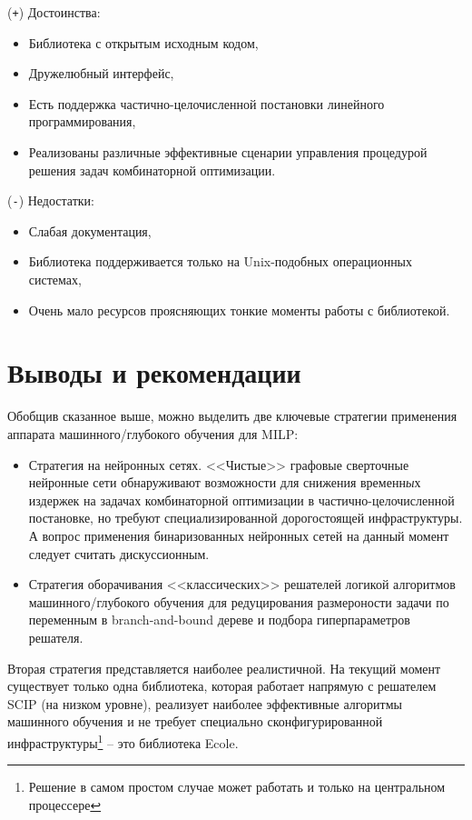 \documentclass[%
	11pt,
	a4paper,
	utf8,
		]{article}
\begin{document}
(\texttt{+}) Достоинства:
\begin{itemize}
	\item Библиотека с открытым исходным кодом,

	\item Дружелюбный интерфейс,

	\item Есть поддержка частично-целочисленной постановки линейного программирования,

	\item Реализованы различные эффективные сценарии управления процедурой решения задач комбинаторной оптимизации.
\end{itemize}

(\texttt{-}) Недостатки:
\begin{itemize}
	\item Слабая документация,

	\item Библиотека поддерживается только на Unix-подобных операционных системах,

	\item Очень мало ресурсов проясняющих тонкие моменты работы с библиотекой.
\end{itemize}


\section{Выводы и рекомендации}

Обобщив сказанное выше, можно выделить две ключевые стратегии применения аппарата машинного/глубокого обучения для MILP:
\begin{itemize}
	\item Стратегия на нейронных сетях. <<Чистые>> графовые сверточные нейронные сети обнаруживают возможности для снижения временн\emph{ы}х издержек на задачах комбинаторной оптимизации в частично-целочисленной постановке, но требуют специализированной дорогостоящей инфраструктуры. А вопрос применения бинаризованных нейронных сетей на данный момент следует считать дискуссионным.

	\item Стратегия оборачивания <<классических>> решателей логикой алгоритмов машинного/глубокого обучения для редуцирования размероности задачи по переменным в branch-and-bound дереве и подбора гиперпараметров решателя.
\end{itemize}

Вторая стратегия представляется наиболее реалистичной. На текущий момент существует только одна библиотека, которая работает напрямую с решателем SCIP (на низком уровне), реализует наиболее эффективные алгоритмы машинного обучения и  не требует специально сконфигурированной инфраструктуры\footnote{Решение в самом простом случае может работать и только на центральном процессере} -- это библиотека Ecole.
\end{document}
